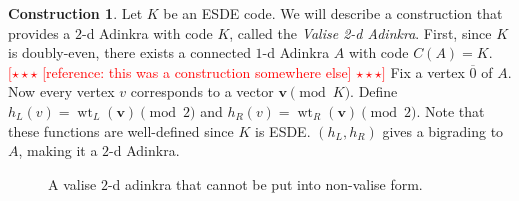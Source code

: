 \documentclass[12pt,twoside,singlespace]{article}
\numberwithin{equation}{section}
\theoremstyle{definition}
\newtheorem{construction}[equation]{Construction}
\newcommand{\on}{\operatorname}
\newcommand{\wt}{\on{wt}}
\newcommand{\com}[1]{\textcolor{red}{$[\star \star \star$ #1 $\star \star \star]$}}
\renewcommand{\vec}[1]{\mathbf{#1}}
\begin{document}
\begin{construction}
\label{cons:valise}
Let $K$ be an ESDE code.  We will describe a construction that provides a $2$-d Adinkra with code $K$, called the {\em Valise 2-d Adinkra}. First, since $K$ is doubly-even, there exists a connected $1$-d Adinkra $A$ with code $C(A) = K$. \com{ [reference: this was a construction somewhere else]} Fix a vertex $\overline{0}$ of $A$. Now every vertex $v$ corresponds to a vector $\vec{v} \pmod{K}$. Define $h_L(v) = \wt_L(\vec{v}) \pmod{2}$ and $h_R(v) = \wt_R(\vec{v}) \pmod{2}$. Note that these functions are well-defined since $K$ is ESDE. $(h_L, h_R)$ gives a bigrading to $A$, making it a $2$-d Adinkra. %
\end{construction}

\begin{figure}[htb]
\begin{center}

\caption{A valise $2$-d adinkra that cannot be put into non-valise form.\label{fig:tight valise}}
\end{center}
\end{figure}
\end{document}
